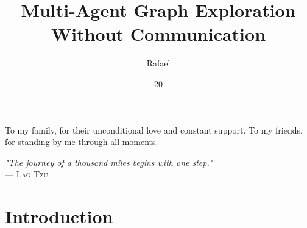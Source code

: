 \documentclass[tg, eng]{ita}    %
\author{Rafael}{Studart Mattos Di Piero}
\title{Multi-Agent Graph Exploration Without Communication}
\date{20}{Jun}{2024}
\begin{document}
\maketitle

\begin{itadedication}To my family, for their unconditional love and constant support. To my friends, for standing by me through all moments. 
\end{itadedication}

\begin{itathanks}

\end{itathanks}


\thispagestyle{empty}
\ifhyperref{}\fi
\begin{flushright}
\begin{spacing}{1}
\mbox{}\vfill
{\sffamily\itshape
"The journey of a thousand miles begins with one step."\\
}
--- \textsc{
Lao Tzu
}
\end{spacing}
\end{flushright}

\begin{abstract}
\noindent

\end{abstract}

\begin{englishabstract}
\noindent

\end{englishabstract}

\listoffigures %



\listofabbreviations


\tableofcontents

\mainmatter

\chapter{Introduction}


% 
\end{document}
